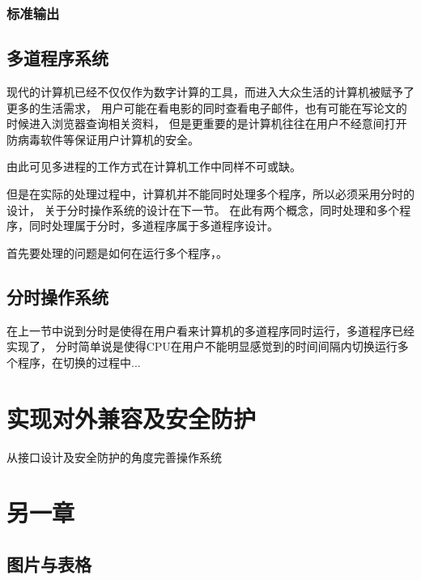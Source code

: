 \documentclass{swfcthesis}
\begin{document}
\begin{listing}[H]
  \inputminted[tabsize=2, firstline=247, lastline=265,
  linenos=true]{c}{../ZOS/src/kernel/bootpack.c}
  \inputminted[tabsize=2, firstline=329, lastline=338,
  linenos=true]{c}{../ZOS/src/kernel/bootpack.c}
\end{listing}

\subsection{标准输出}


\section{多道程序系统}

现代的计算机已经不仅仅作为数字计算的工具，而进入大众生活的计算机被赋予了更多的生活需求，
用户可能在看电影的同时查看电子邮件，也有可能在写论文的时候进入浏览器查询相关资料，
但是更重要的是计算机往往在用户不经意间打开防病毒软件等保证用户计算机的安全\cite{tanenbaum2009modern}。

由此可见多进程的工作方式在计算机工作中同样不可或缺。

但是在实际的处理过程中，计算机并不能同时处理多个程序，所以必须采用分时的设计，
关于分时操作系统的设计在下一节。
在此有两个概念，同时处理和多个程序，同时处理属于分时，多道程序属于多道程序设计。

首先要处理的问题是如何在运行多个程序，。

\section{分时操作系统}

在上一节中说到分时是使得在用户看来计算机的多道程序同时运行，多道程序已经实现了，
分时简单说是使得CPU在用户不能明显感觉到的时间间隔内切换运行多个程序，在切换的过程中...

\chapter{实现对外兼容及安全防护}

从接口设计及安全防护的角度完善操作系统


\chapter{另一章}

\section{图片与表格}
\end{document}
